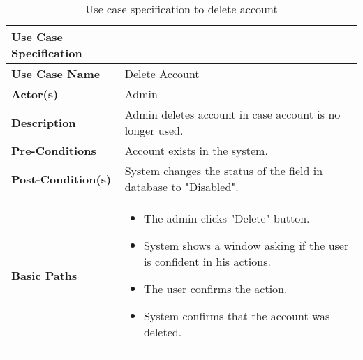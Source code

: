 \documentclass[a4paper]{article}
\begin{document}
      \begin{longtable}{|p{}|p{}|}
        \caption{Use case specification to delete account}
        \label{deleteAccountUseCase} \\
        \hline
        Use Case Specification  &  \\
         \hline
         \endhead
         \textbf{Use Case Name} & Delete Account\\
         \hline
         \textbf{Actor(s)} & Admin \\
         \hline
         \textbf{Description} & Admin deletes account in case account is no longer used. \\
         \hline
         \textbf{Pre-Conditions} &  Account exists in the system.\\
         \hline
        \textbf{Post-Condition(s)} & System changes the status of the field in database to "Disabled". \\
         \hline
         \textbf{Basic Paths} & 
         \begin{itemize}
             \item The admin clicks "Delete" button.
             \item System shows a window asking if the user is confident in his actions.
             \item The user confirms the action.            
             \item System confirms that the account was deleted.
         \end{itemize} 
       \\
        \hline
    \end{longtable}
    
\end{document}
